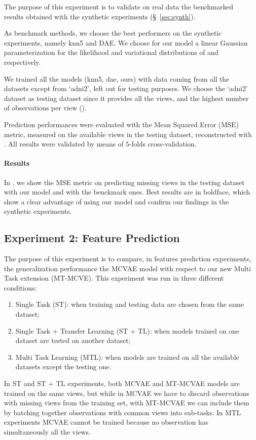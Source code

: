 The purpose of this experiment is to validate on real data the benchmarked results obtained with the synthetic experiments (\S~\ref{sec:synth}).

As benchmark methods, we choose the best performers on the synthetic experiments, namely knn5 and DAE.
We choose for our model a linear Gaussian parameterization for the likelihood and variational distributions of  and  respectively.

We trained all the models (knn5, dae, ours) with data coming from all the datasets except from `adni2', left out for testing purposes.
We choose the `adni2' dataset as testing dataset since it provides all the views, and the highest number of observations per view ().

Prediction performances were evaluated with the Mean Squared Error (MSE) metric, measured on the available views in the testing dataset, reconstructed with .
All results were validated by means of $5$-folds cross-validation.

\paragraph{Results}
In , we show the MSE metric on predicting missing views in the testing dataset with our model and with the benckmark ones.
Best results are in boldface, which show a clear advantage of using our model and confirm our findings in the synthetic experiments.

\subsection{Experiment 2: Feature Prediction}
\label{ssec:feats}

The purpose of this experiment is to compare, in features prediction experiments, the generalization performance the MCVAE model with respect to our new Multi Task extension (MT-MCVE).
This experiment was run in three different conditions:
%
\begin{enumerate}
\item Single Task (ST): when training and testing data are chosen from the same dataset;
%
\item Single Task + Transfer Learning (ST + TL): when models trained on one dataset are tested on another dataset;
%
\item Multi Task Learning (MTL): when models are trained on all the available datasets except the testing one.
%
\end{enumerate}
%
In ST and ST + TL experiments, both MCVAE and MT-MCVAE models are trained on the same views,
but while in MCVAE we have to discard observations with missing views from the training set, with MT-MCVAE we can include them by batching together observations with common views into sub-tasks.
In MTL experiments MCVAE cannot be trained because no observation has simultaneously all the views.


